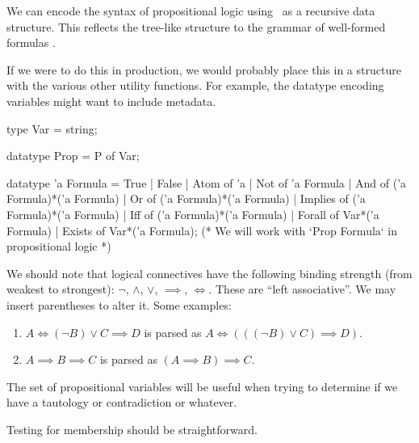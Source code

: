 \begin{node}[Syntax]
\begin{definition}
\begin{node}\label{prop-000G}%
We can encode the syntax of propositional logic using \SML\ as a
recursive data structure. This reflects the tree-like structure to the
grammar of well-formed formulas .

If we were to do this in production, we would probably place this in a
structure with the various other utility functions. For example, the
datatype encoding variables might want to include metadata.

\begin{sml}
type Var = string;

datatype Prop = P of Var;

datatype 'a Formula = True
                    | False
                    | Atom of 'a
                    | Not of 'a Formula
                    | And of ('a Formula)*('a Formula)
                    | Or of ('a Formula)*('a Formula)
                    | Implies of ('a Formula)*('a Formula)
                    | Iff of ('a Formula)*('a Formula)
                    | Forall of Var*('a Formula)
                    | Exists of Var*('a Formula);
(* We will work with `Prop Formula` in propositional logic *)
\end{sml}
\end{node}
\end{definition}

\begin{node}[Precedence]\label{prop-000D}%
We should note that logical connectives have the following binding
strength (from weakest to strongest): $\neg$, $\land$, $\lor$,
$\implies$, $\iff$. These are ``left associative''. We may insert
parentheses to alter it. Some examples:
\begin{enumerate}
\item $A\iff (\neg B)\lor C\implies D$ is parsed as $A\iff(((\neg B)\lor C)\implies D)$.
\item $A\implies B\implies C$ is parsed as $(A\implies B)\implies C$.
\end{enumerate}
\end{node}


\begin{node}\label{prop:syntax-0000}%
The set of propositional variables will be useful when trying to
determine if we have a tautology or contradiction or whatever.

\begin{node}\label{prop:syntax-0002}%
Testing for membership should be straightforward.


\end{node}
\end{node}
\end{node}
